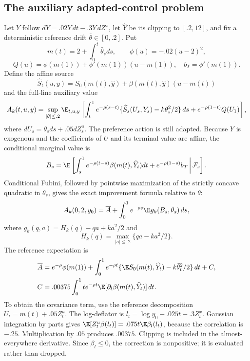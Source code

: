 \subsection{The auxiliary adapted-control problem}
Let $Y$ follow $dY=.02Y\,dt-.3Y\,dZ^x$, let $\widehat Y$ be its clipping to $[.2,12]$, and fix a deterministic reference drift $\bar\theta\in[0,.2]$. Put
\[
 m(t)=2+\int_0^t\bar\theta_sds,\qquad \phi(u)=-.02(u-2)^2,
\]
\[
 Q(u)=\phi(m(1))+\phi'(m(1))(u-m(1)),\quad b_T=\phi'(m(1)).
\]
Define the affine source
\[
 \widehat S_t(u,y)=S_0(m(t),\widehat y)+\beta(m(t),\widehat y)(u-m(t))
\]
and the full-line auxiliary value
\begin{equation}
 A_k(t,u,y)=\sup_{|\theta|\leq.2}\E_{t,u,y}\left[
 \int_t^1e^{-\rho(s-t)}\{\widehat S_s(U_s,Y_s)-k\theta_s^2/2\}\,ds
 +e^{-\rho(1-t)}Q(U_1)\right],\label{supp:aux}
\end{equation}
where $dU_s=\theta_sds+.05dZ^u_s$. The preference action is still adapted. Because $Y$ is exogenous and the coefficients of $U$ and its terminal value are affine, the conditional marginal value is
\[
 B_s=\E\left[\int_s^1e^{-\rho(t-s)}\beta(m(t),\widehat Y_t)dt
                +e^{-\rho(1-s)}b_T\,\middle|\,\mathcal F_s\right].
\]
Conditional Fubini, followed by pointwise maximization of the strictly concave quadratic in $\theta_s$, gives the exact improvement formula relative to $\bar\theta$:
\begin{equation}
 A_k(0,2,y_0)=\overline A+
 \int_0^1e^{-\rho s}\E g_k(B_s,\bar\theta_s)\,ds,\label{supp:exactA}
\end{equation}
where $g_k(q,a)=H_k(q)-qa+ka^2/2$ and
\[
 H_k(q)=\max_{|a|\leq.2}\{qa-ka^2/2\}.
\]
The reference expectation is
\begin{align}
 \overline A={}&e^{-\rho}\phi(m(1))+
 \int_0^1e^{-\rho t}\{\E S_0(m(t),\widehat Y_t)-k\bar\theta_t^2/2\}\,dt+C,\label{supp:Abar}\\
 C={}&.00375\int_0^1te^{-\rho t}
       \E[\partial_l\beta(m(t),\widehat Y_t)]\,dt.\label{supp:cov}
\end{align}
To obtain the covariance term, use the reference decomposition $U_t=m(t)+.05Z^u_t$. The log-deflator is $l_t=\log y_0-.025t-.3Z^x_t$. Gaussian integration by parts gives
$\E[Z^u_t\beta(l_t)]=.075t\E\beta_l(l_t)$, because the correlation is $-.25$. Multiplication by $.05$ produces $.00375$. Clipping is included in the almost-everywhere derivative. Since $\beta_l\leq0$, the correction is nonpositive; it is evaluated rather than dropped.

